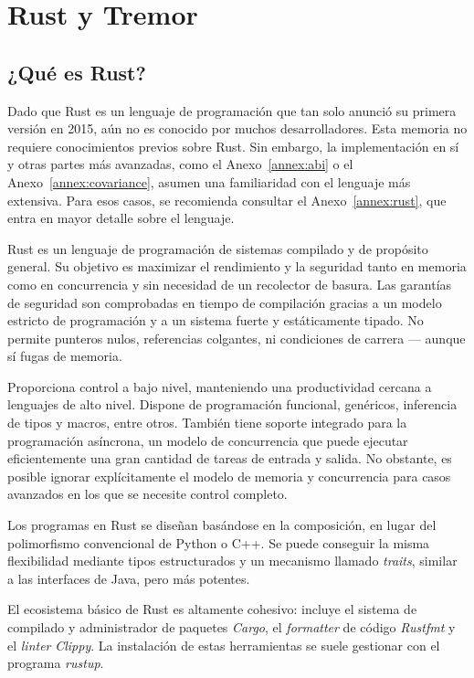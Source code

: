 
\chapter{Rust y Tremor}

\section{¿Qué es Rust?}\label{sec:rust}

Dado que Rust es un lenguaje de programación que tan solo anunció su primera
versión en 2015, aún no es conocido por muchos desarrolladores. Esta memoria no
requiere conocimientos previos sobre Rust. Sin embargo, la implementación en sí
y otras partes más avanzadas, como el Anexo~\ref{annex:abi} o el
Anexo~\ref{annex:covariance}, asumen una familiaridad con el lenguaje más
extensiva. Para esos casos, se recomienda consultar el Anexo~\ref{annex:rust},
que entra en mayor detalle sobre el lenguaje.

Rust es un lenguaje de programación de sistemas compilado y de propósito
general. Su objetivo es maximizar el rendimiento y la seguridad tanto en memoria
como en concurrencia y sin necesidad de un recolector de basura. Las garantías
de seguridad son comprobadas en tiempo de compilación gracias a un modelo
estricto de programación y a un sistema fuerte y estáticamente tipado. No
permite punteros nulos, referencias colgantes, ni condiciones de carrera ---
aunque sí fugas de memoria.

Proporciona control a bajo nivel, manteniendo una productividad cercana a
lenguajes de alto nivel. Dispone de programación funcional, genéricos,
inferencia de tipos y macros, entre otros. También tiene soporte integrado para
la programación asíncrona, un modelo de concurrencia que puede ejecutar
eficientemente una gran cantidad de tareas de entrada y salida. No obstante, es
posible ignorar explícitamente el modelo de memoria y concurrencia para casos
avanzados en los que se necesite control completo.

Los programas en Rust se diseñan basándose en la composición, en lugar del
polimorfismo convencional de Python o C++. Se puede conseguir la misma
flexibilidad mediante tipos estructurados y un mecanismo llamado \emph{traits},
similar a las interfaces de Java, pero más potentes.

El ecosistema básico de Rust es altamente cohesivo: incluye el sistema de
compilado y administrador de paquetes \emph{Cargo}, el \emph{formatter} de
código \emph{Rustfmt} y el \emph{linter} \emph{Clippy}. La instalación de estas
herramientas se suele gestionar con el programa \emph{rustup}.

